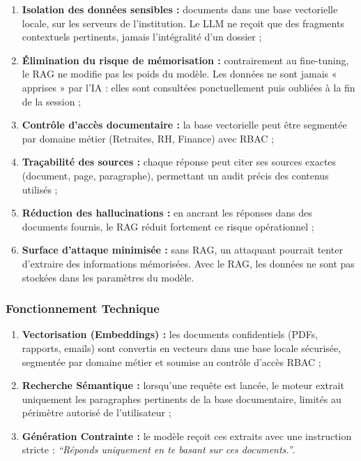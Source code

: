 \documentclass[12pt, a4paper]{report}
\begin{document}
\begin{enumerate}
  \item \textbf{Isolation des données sensibles :} documents dans une
        base vectorielle locale, sur les serveurs de l'institution. Le
        LLM ne reçoit que des fragments contextuels pertinents, jamais
        l'intégralité d'un dossier ;
  \item \textbf{Élimination du risque de mémorisation :} contrairement
        au fine-tuning, le RAG ne modifie pas les poids du modèle. Les
        données ne sont jamais « apprises » par l'IA : elles sont
        consultées ponctuellement puis oubliées à la fin de la session ;
  \item \textbf{Contrôle d'accès documentaire :} la base vectorielle
        peut être segmentée par domaine métier (Retraites, RH, Finance)
        avec RBAC ;
  \item \textbf{Traçabilité des sources :} chaque réponse peut citer ses
        sources exactes (document, page, paragraphe), permettant un audit
        précis des contenus utilisés ;
  \item \textbf{Réduction des hallucinations :} en ancrant les réponses
        dans des documents fournis, le RAG réduit fortement ce risque
        opérationnel ;
  \item \textbf{Surface d'attaque minimisée :} sans RAG, un attaquant
        pourrait tenter d'extraire des informations mémorisées. Avec le
        RAG, les données ne sont pas stockées dans les paramètres du
        modèle.
\end{enumerate}

\subsubsection{Fonctionnement Technique}

\begin{enumerate}
  \item \textbf{Vectorisation (Embeddings) :} les documents confidentiels
        (PDFs, rapports, emails) sont convertis en vecteurs dans une base
        locale sécurisée, segmentée par domaine métier et soumise au
        contrôle d'accès RBAC ;
  \item \textbf{Recherche Sémantique :} lorsqu'une requête est lancée,
        le moteur extrait uniquement les paragraphes pertinents de la
        base documentaire, limités au périmètre autorisé de l'utilisateur ;
  \item \textbf{Génération Contrainte :} le modèle reçoit ces extraits
        avec une instruction stricte : \textit{``Réponds uniquement en
        te basant sur ces documents.''}.
\end{enumerate}
\end{document}
